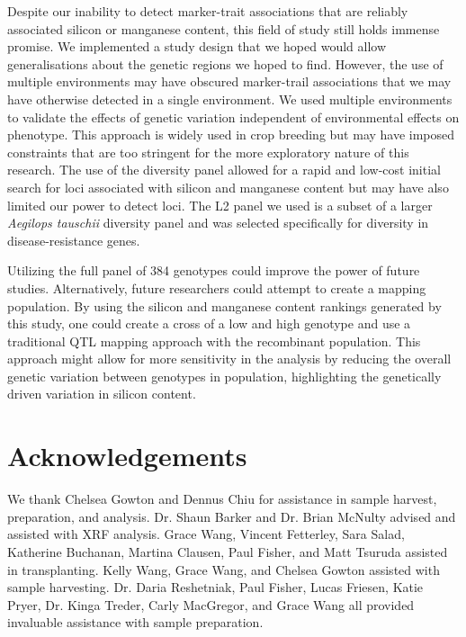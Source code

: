 \documentclass[12pt, letterpaper]{report}
\begin{document}
Despite our inability to detect marker-trait associations that are reliably associated silicon or manganese content, this field of study still holds immense promise. We implemented a study design that we hoped would allow generalisations about the genetic regions we hoped to find. However, the use of multiple environments may have obscured marker-trail associations that we may have otherwise detected in a single environment. We used multiple environments to validate the effects of genetic variation independent of environmental effects on phenotype. This approach is widely used in crop breeding but may have imposed constraints that are too stringent for the more exploratory nature of this research. The use of the diversity panel allowed for a rapid and low-cost initial search for loci associated with silicon and manganese content but may have also limited our power to detect loci. The L2 panel we used is a subset of a larger \textit{Aegilops tauschii} diversity panel and was selected specifically for diversity in disease-resistance genes.

Utilizing the full panel of 384 genotypes could improve the power of future studies. Alternatively, future researchers could attempt to create a mapping population. By using the silicon and manganese content rankings generated by this study, one could create a cross of a low and high genotype and use a traditional QTL mapping approach with the recombinant population. This approach might allow for more sensitivity in the analysis by reducing the overall genetic variation between genotypes in population, highlighting the genetically driven variation in silicon content.

\section{Acknowledgements}

We thank Chelsea Gowton and Dennus Chiu for assistance in sample harvest, preparation, and analysis. Dr. Shaun Barker and Dr. Brian McNulty advised and assisted with XRF analysis. Grace Wang, Vincent Fetterley, Sara Salad, Katherine Buchanan, Martina Clausen, Paul Fisher, and Matt Tsuruda assisted in transplanting. Kelly Wang, Grace Wang, and Chelsea Gowton assisted with sample harvesting. Dr. Daria Reshetniak, Paul Fisher, Lucas Friesen, Katie Pryer, Dr. Kinga Treder, Carly MacGregor, and Grace Wang all provided invaluable assistance with sample preparation. 

\clearpage
\end{document}

